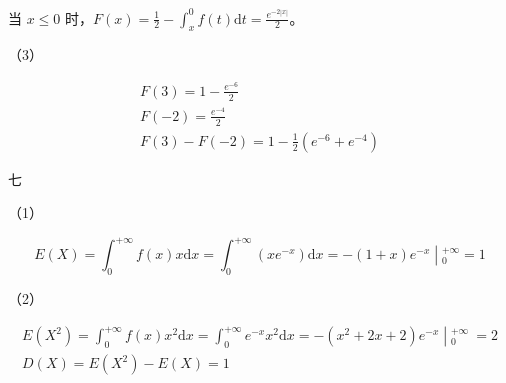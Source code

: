 \documentclass[UTF-8]{ctexart}
\begin{document}
当 $\displaystyle x\leqslant 0$ 时，$\displaystyle F( x) =\frac{1}{2} -\int _{x}^{0} f( t)\mathrm{d} t=\frac{e^{-2|x|}}{2}$。

（3）


\begin{gather*}
F( 3) =1-\frac{e^{-6}}{2}\\
F( -2) =\frac{e^{-4}}{2}\\
F( 3) -F( -2) =1-\frac{1}{2}\left( e^{-6} +e^{-4}\right)
\end{gather*}


七

（1）


\begin{equation*}
E( X) =\int _{0}^{+\infty } f( x) x\mathrm{d} x=\int _{0}^{+\infty }\left( xe^{-x}\right)\mathrm{d} x=\left. -( 1+x) e^{-x}\middle| _{0}^{+\infty }\right. =1
\end{equation*}


（2）


\begin{gather*}
E\left( X^{2}\right) =\int _{0}^{+\infty } f( x) x^{2}\mathrm{d} x=\int _{0}^{+\infty } e^{-x} x^{2}\mathrm{d} x=\left. -\left( x^{2} +2x+2\right) e^{-x}\middle| _{0}^{+\infty } \ \right. =2\\
D( X) =E\left( X^{2}\right) -E( X) =1
\end{gather*}
\end{document}
